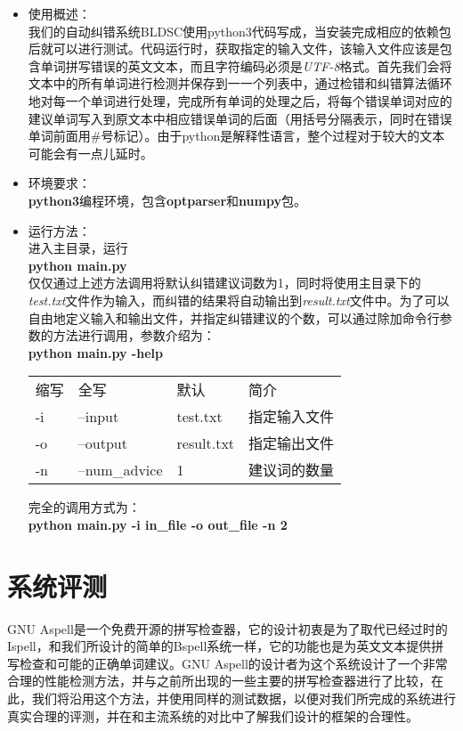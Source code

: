 \documentclass[UTF8,a4paper]{ctexart}
\begin{document}
\begin{itemize}
    \item 使用概述： \\
    我们的自动纠错系统BLDSC使用python3代码写成，当安装完成相应的依赖包后就可以进行测试。代码运行时，获取指定的输入文件，该输入文件应该是包含单词拼写错误的英文文本，而且字符编码必须是\textit{UTF-8}格式。首先我们会将文本中的所有单词进行检测并保存到一一个列表中，通过检错和纠错算法循环地对每一个单词进行处理，完成所有单词的处理之后，将每个错误单词对应的建议单词写入到原文本中相应错误单词的后面（用括号分隔表示，同时在错误单词前面用\#号标记）。由于python是解释性语言，整个过程对于较大的文本可能会有一点儿延时。
  \item 环境要求： \\
  \textbf{python3}编程环境，包含\textbf{optparser}和\textbf{numpy}包。
  \item 运行方法： \\
  进入主目录，运行 \\
  \quad \textbf{python main.py} \\
  仅仅通过上述方法调用将默认纠错建议词数为1，同时将使用主目录下的\textit{test.txt}文件作为输入，而纠错的结果将自动输出到\textit{result.txt}文件中。为了可以自由地定义输入和输出文件，并指定纠错建议的个数，可以通过除加命令行参数的方法进行调用，参数介绍为： \\
  \quad \textbf{python main.py -help}

  \begin{tabular}{|l|l|l|l|}
    \hline
    缩写 & 全写 & 默认 & 简介 \\
    -i & --input & test.txt & 指定输入文件 \\
    -o & --output & result.txt & 指定输出文件 \\
    -n & --num\_advice & 1 & 建议词的数量  \\
    \hline
  \end{tabular}

  完全的调用方式为： \\
  \quad \textbf{python main.py -i in\_file -o out\_file -n 2}
\end{itemize}

\section{系统评测}

GNU Aspell\cite{atkinson2011gnu}是一个免费开源的拼写检查器，它的设计初衷是为了取代已经过时的Ispell\cite{gorin19712003}，和我们所设计的简单的Bspell系统一样，它的功能也是为英文文本提供拼写检查和可能的正确单词建议。GNU Aspell的设计者为这个系统设计了一个非常合理的性能检测方法，并与之前所出现的一些主要的拼写检查器进行了比较，在此，我们将沿用这个方法，并使用同样的测试数据，以便对我们所完成的系统进行真实合理的评测，并在和主流系统的对比中了解我们设计的框架的合理性。
\end{document}
